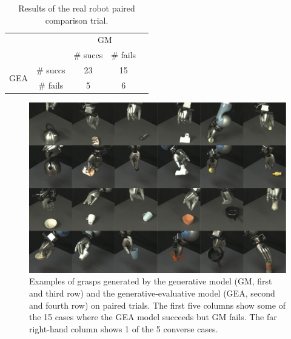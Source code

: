 
\begin{table}
\begin{center}
\caption{Results of the real robot paired comparison trial.}
\label{my-label}
\begin{tabular}{|cc|c|c|l}
\cline{1-4}
                                           &         & \multicolumn{2}{c|}{GM} &  \\ \cline{3-4}
                                           &         & \# succs    & \# fails    &  \\ \cline{1-4}
\multicolumn{1}{|c|}{\multirow{2}{*}{GEA}} & \# succs & 23         & 15         &  \\
\multicolumn{1}{|c|}{}                     & \# fails & 5          & 6          &  \\ \cline{1-4}
\end{tabular}
\end{center}
\label{tab:robot-results}
\end{table}


\begin{figure}
\includegraphics[width=\textwidth]{images/successfailure.pdf}
\caption{Examples of grasps generated by the generative model (GM, first and third row) and the generative-evaluative model (GEA, second and fourth row) on paired trials. The first five columns show some of the 15 cases where the GEA model succeeds but GM fails. The far right-hand column shows 1 of the 5 converse cases. \label{fig:successfail}}
\end{figure}

%
